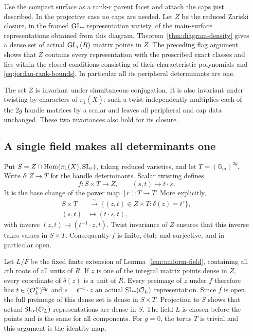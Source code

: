 Use the compact surface as a rank-$r$ parent facet and attach the
caps just described.  In the projective case no caps are needed.
Let $Z$ be the reduced Zariski closure, in the framed $\operatorname{GL}_r$
representation variety, of the main-surface representations obtained
from this diagram.  Theorem~\ref{thm:diagram-density} gives a dense
set of actual $\operatorname{GL}_r(R)$ matrix points in $Z$.  The preceding flag
argument shows that $Z$ contains every representation with the
prescribed exact classes and lies within the closed conditions
consisting of their characteristic polynomials and
\eqref{eq:jordan-rank-bounds}.  In particular all its peripheral
determinants are one.

The set $Z$ is invariant under simultaneous conjugation.  It is also
invariant under twisting by characters of $\pi_1(\overline X)$:
such a twist independently multiplies each of the $2g$ handle
matrices by a scalar and leaves all peripheral and cap data
unchanged.  These two invariances also hold for its closure.

\subsection{A single field makes all determinants one}

Put $S=Z\cap\operatorname{Hom}(\pi_1(X),\operatorname{SL}_r)$, taking reduced varieties, and
let $T=(\mathbb G_m)^{2g}$.  Write $\delta:Z\to T$ for the handle
determinants.  Scalar twisting defines
\[
 f:S\times T\longrightarrow Z,\qquad (s,t)\longmapsto t\cdot s.
\]
It is the base change of the power map $[r]:T\to T$.  More
explicitly,
\begin{equation}\label{eq:determinant-pullback}
 \begin{split}
 S\times T&\ \xrightarrow{\ \sim\ }\
       \{(z,t)\in Z\times T:\delta(z)=t^r\},\\
 (s,t)&\longmapsto(t\cdot s,t),
 \end{split}
\end{equation}
with inverse $(z,t)\mapsto(t^{-1}\cdot z,t)$.
Twist invariance of $Z$ ensures that this inverse takes values in
$S\times T$.  Consequently $f$ is finite, \'etale and surjective,
and in particular open.

Let $L/F$ be the fixed finite extension of
Lemma~\ref{lem:uniform-field}, containing all $r$th roots of all
units of $R$.  If $z$ is one of the integral matrix points dense in
$Z$, every coordinate of $\delta(z)$ is a unit of $R$.
Every preimage of $z$ under $f$ therefore has $t\in
(\mathcal O_L^\times)^{2g}$ and $s=t^{-1}\cdot z$ an actual
$\operatorname{SL}_r(\mathcal O_L)$ representation.  Since $f$ is open, the full
preimage of this dense set is dense in $S\times T$.  Projection to
$S$ shows that actual $\operatorname{SL}_r(\mathcal O_L)$ representations are dense
in $S$.  The field $L$ is chosen before the points and is the same
for all components.  For $g=0$, the torus $T$ is trivial and this
argument is the identity map.

